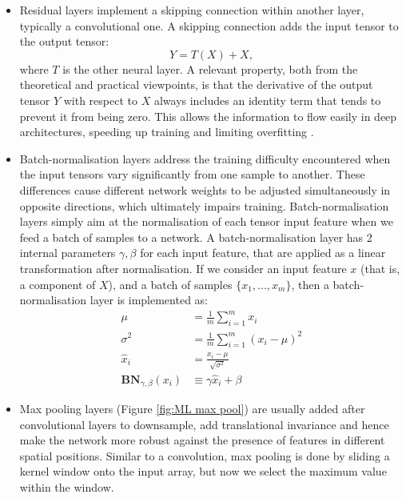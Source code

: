 \begin{itemize}
    \item Residual layers implement a skipping connection within another layer, typically a convolutional one. A skipping connection adds the input tensor to the output tensor:
    \begin{equation}
        Y=T(X)+X,
    \end{equation}
    where $T$ is the other neural layer. A relevant property, both from the theoretical and practical viewpoints, is that the derivative of the output tensor $Y$ with respect to $X$ always includes an identity term that tends to prevent it from being zero. This allows the information to flow easily in deep architectures, speeding up training and limiting overfitting \cite{residual_paper}.
    \item Batch-normalisation layers \cite{ioffe2015batch} address the training difficulty encountered when the input tensors vary significantly from one sample to another. These differences cause different network weights to be adjusted simultaneously in opposite directions, which ultimately impairs training. Batch-normalisation layers simply aim at the normalisation of each tensor input feature when we feed a batch of samples to a network. A batch-normalisation layer has 2 internal parameters $\gamma,\beta$ for each input feature, that are applied as a linear transformation after normalisation. If we consider an input feature $x$ (that is, a component of $X$), and a batch of samples $\{x_1,...,x_m \}$, then a batch-normalisation layer is implemented as:
    \begin{equation}
        \begin{aligned}
            \mu& =\frac1m\sum_{i=1}^mx_i  \\
            \sigma^2& =\frac1m\sum_{i=1}^m(x_i-\mu)^2  \\
            \widehat{x}_i& =\frac{x_i-\mu}{\sqrt{\sigma^2}}  \\
            \mathbf{BN}_{\gamma,\beta}(x_i)&\equiv \gamma\widehat{x}_i+\beta
            \end{aligned}
    \end{equation}
    


    \item Max pooling layers (Figure \ref{fig:ML max pool}) are usually added after convolutional layers to downsample, add translational invariance and hence make the network more robust against the presence of features in different spatial positions. Similar to a convolution, max pooling is done by sliding a kernel window onto the input array, but now we select the maximum value within the window.
\end{itemize}

